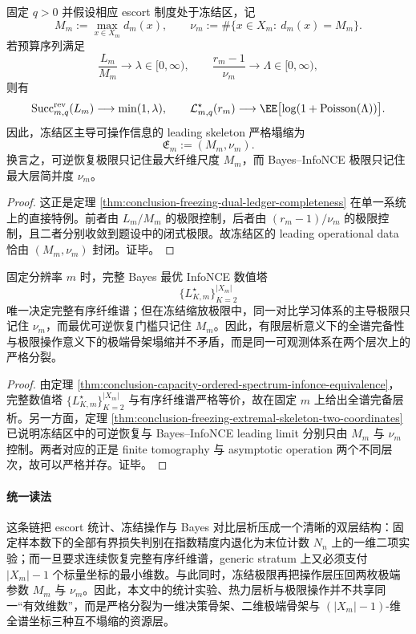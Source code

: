 \begin{theorem}[冻结区的极端骨架双坐标]\label{thm:conclusion-freezing-extremal-skeleton-two-coordinates}
固定 \(q>0\) 并假设相应 escort 制度处于冻结区，记
\[
M_m:=\max_{x\in X_m} d_m(x),
\qquad
\nu_m:=\#\{x\in X_m:\ d_m(x)=M_m\}.
\]
若预算序列满足
\[
\frac{L_m}{M_m}\to \lambda\in[0,\infty),
\qquad
\frac{r_m-1}{\nu_m}\to \Lambda\in[0,\infty),
\]
则有
\[
\mathrm{Succ}^{\mathrm{rev}}_{m,q}(L_m)\longrightarrow \min(1,\lambda),
\qquad
\mathcal L^\star_{m,q}(r_m)\longrightarrow
\EE\bigl[\log(1+\mathrm{Poisson}(\Lambda))\bigr].
\]
因此，冻结区主导可操作信息的 leading skeleton 严格塌缩为
\[
\mathfrak E_m:=(M_m,\nu_m).
\]
换言之，可逆恢复极限只记住最大纤维尺度 \(M_m\)，而 Bayes--InfoNCE 极限只记住最大层简并度 \(\nu_m\)。
\end{theorem}
\begin{proof}
这正是定理 \ref{thm:conclusion-freezing-dual-ledger-completeness} 在单一系统上的直接特例。前者由 \(L_m/M_m\) 的极限控制，后者由 \((r_m-1)/\nu_m\) 的极限控制，且二者分别收敛到题设中的闭式极限。故冻结区的 leading operational data 恰由 \((M_m,\nu_m)\) 封闭。证毕。
\end{proof}

\begin{corollary}[全谱完备性与极端塌缩的并存]\label{cor:conclusion-full-spectrum-completeness-coexists-with-extremal-collapse}
固定分辨率 \(m\) 时，完整 Bayes 最优 InfoNCE 数值塔
\[
\{L_{K,m}^{\star}\}_{K=2}^{|X_m|}
\]
唯一决定完整有序纤维谱；但在冻结缩放极限中，同一对比学习体系的主导极限只记住 \(\nu_m\)，而最优可逆恢复门槛只记住 \(M_m\)。因此，有限层析意义下的全谱完备性与极限操作意义下的极端骨架塌缩并不矛盾，而是同一可观测体系在两个层次上的严格分裂。
\end{corollary}
\begin{proof}
由定理 \ref{thm:conclusion-capacity-ordered-spectrum-infonce-equivalence}，完整数值塔 \(\{L_{K,m}^{\star}\}_{K=2}^{|X_m|}\) 与有序纤维谱严格等价，故在固定 \(m\) 上给出全谱完备层析。另一方面，定理 \ref{thm:conclusion-freezing-extremal-skeleton-two-coordinates} 已说明冻结区中的可逆恢复与 Bayes--InfoNCE leading limit 分别只由 \(M_m\) 与 \(\nu_m\) 控制。两者对应的正是 finite tomography 与 asymptotic operation 两个不同层次，故可以严格并存。证毕。
\end{proof}

\paragraph{统一读法}
这条链把 escort 统计、冻结操作与 Bayes 对比层析压成一个清晰的双层结构：固定样本数下的全部有界损失判别在指数精度内退化为末位计数 \(N_n\) 上的一维二项实验；而一旦要求连续恢复完整有序纤维谱，generic stratum 上又必须支付 \(|X_m|-1\) 个标量坐标的最小维数。与此同时，冻结极限再把操作层压回两枚极端参数 \(M_m\) 与 \(\nu_m\)。因此，本文中的统计实验、热力层析与极限操作并不共享同一“有效维数”，而是严格分裂为一维决策骨架、二维极端骨架与 \((|X_m|-1)\)-维全谱坐标三种互不塌缩的资源层。

\endinput

